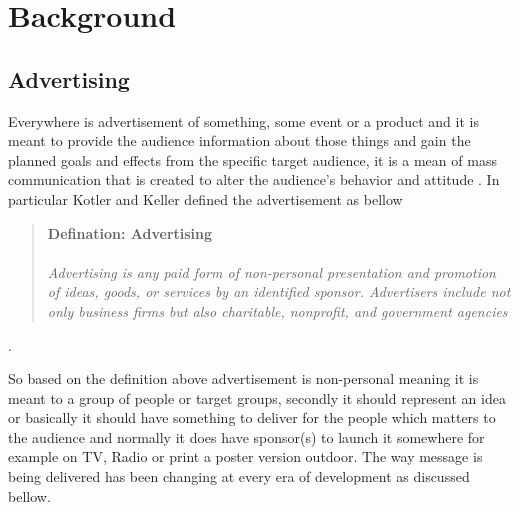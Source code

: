 
\chapter{Background} %

\label{Chapter2} %
\newpage

\section{Advertising}

Everywhere is advertisement of something, some event or a product and it is meant to provide the audience information about those things and gain the planned goals and effects from the specific target audience, it is a mean of mass communication that is created to alter the audience’s behavior and attitude \cite{advertisementdef}. In particular Kotler and Keller defined the advertisement as bellow

\begin{snugshade}
\begin{quote}\textbf{Defination: Advertising }\\ \\ \emph{Advertising is any paid form of non-personal presentation and promotion of ideas, goods, or services by an identified sponsor. Advertisers include not only business firms but also charitable, nonprofit, and government agencies}\end{quote}\cite{ad_def}.
\end{snugshade}

So based on the definition above advertisement is non-personal meaning it is meant to a group of people or target groups, secondly it should represent an idea or basically it should have something to deliver for the people which matters to the audience and normally it does have sponsor(s) to launch it somewhere for example on TV, Radio or print a poster version outdoor. The way message is being delivered has been changing at every era of development as discussed bellow.



